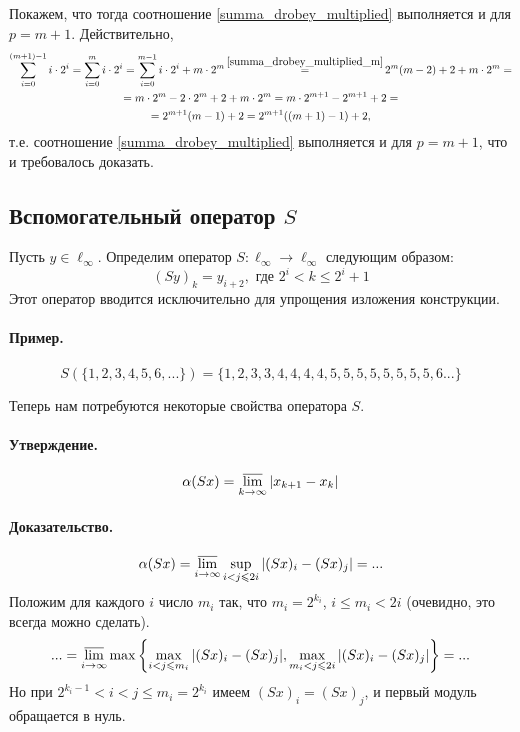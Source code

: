 Покажем, что тогда соотношение \eqref{summa_drobey_multiplied} выполняется и для $p=m+1$.
Действительно,
\begin{multline}
	\sum_{i=0}^{(m+1)-1} i \cdot 2^i
	=
	\sum_{i=0}^{m} i \cdot 2^i
	=
	\sum_{i=0}^{m - 1} i \cdot 2^i + m\cdot 2 ^m
	\mathop{=}^{\eqref{summa_drobey_multiplied_m}}
	2^m(m-2) + 2 + m\cdot 2 ^m
	=
	\\=
	m\cdot2^m-2\cdot2^m  + 2 + m\cdot 2 ^m
	=
	m\cdot2^{m+1}-2^{m+1}  + 2
	=
	\\=
	2^{m+1}(m-1)  + 2
	=
	2^{m+1}((m+1)-1)  + 2
	,
\end{multline}
т.е. соотношение \eqref{summa_drobey_multiplied} выполняется и для $p=m+1$,
что и требовалось доказать.



\subsection{Вспомогательный оператор $S$}
Пусть $y\in \ell_\infty$.
Определим оператор $S:\ell_\infty \to \ell_\infty$ следующим образом:
\begin{equation}\label{operator_S}
	(Sy)_k = y_{i+2}, \mbox{ где } 2^i < k \leq 2^i+1
\end{equation}
Этот оператор вводится исключительно для упрощения изложения конструкции.

\paragraph{Пример.}
$$
	S(\{1,2,3,4,5,6, ...\}) = \{1,2,3,3,4,4,4,4,5,5,5,5,5,5,5,5,6...\}
$$


Теперь нам потребуются некоторые свойства оператора $S$.

\paragraph{Утверждение.}
\begin{equation}\label{alpha_S}
	\alpha(Sx) = \varlimsup_{k\to\infty} |x_{k+1} - x_{k}|
\end{equation}

\paragraph{Доказательство.}

\begin{equation*}
	\alpha(Sx) =
	\varlimsup_{i\to\infty} \sup_{i < j \leq 2i} | (Sx)_i - (Sx)_j | = ...
\end{equation*}
Положим для каждого $i$ число $m_i$ так,
что $m_i = 2^{k_i}$, $i \leq m_i < 2i$
(очевидно, это всегда можно сделать).
\begin{equation*}
	... =
	\varlimsup_{i\to\infty} \max \left\{
		\max_{i   < j \leq m_i} | (Sx)_i - (Sx)_j |,
		\max_{m_i < j \leq 2i } | (Sx)_i - (Sx)_j |
	\right\} =
	...
\end{equation*}
Но при $2^{k_i - 1} < i < j \leq m_i = 2^{k_i}$
имеем $(Sx)_i = (Sx)_j$, и первый модуль обращается в нуль.

